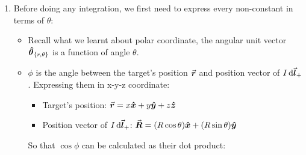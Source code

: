 \documentclass[class=article, crop=false, 12pt]{standalone}
\begin{document}
\begin{enumerate}
    So the potential becomes
    
    \item Before doing any integration, we first need to express every non-constant in terms of $\theta$: 
    \begin{itemize}
        \item Recall what we learnt about polar coordinate,
        the angular unit vector $\vu*{\theta}_{\{r,\theta\}}$ is a function of angle $\theta$.

        \item $\phi$ is the angle between the target's position $\va*{r}$ and position vector of $I\dd{\va*{l}_+}$. 
        Expressing them in x-y-z coordinate:
        \begin{itemize}
            \item Target's position: $\va*{r} = x\vu*{x}+y\vu*{y}+z\vu*{z}$
            \item Position vector of $I\dd{\va*{l}_+}$: $\va*{R} = (R\cos\theta) \vu*{x} + (R\sin\theta)\vu*{y}$ 
        \end{itemize}
        So that $\cos\phi$ can be calculated as their dot product:
    \end{itemize}
    

\end{enumerate}
\end{document}
